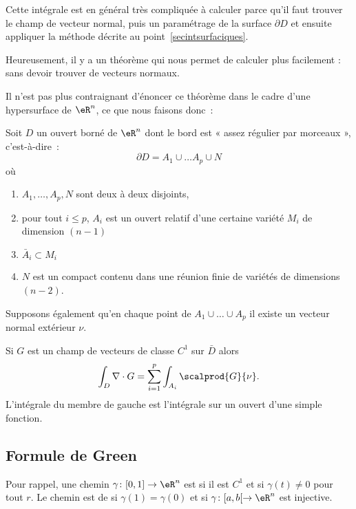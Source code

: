 Cette intégrale est en général très compliquée à calculer parce qu'il faut trouver le champ de vecteur normal, puis un paramétrage de la surface \( \partial D\) et ensuite appliquer la méthode décrite au point~\ref{secintsurfaciques}.

Heureusement, il y a un théorème qui nous permet de calculer plus facilement : sans devoir trouver de vecteurs normaux.

Il n'est pas plus contraignant d'énoncer ce théorème dans le cadre d'une hypersurface de \( \eR^n\), ce que nous faisons donc~:
\begin{theorem}
	Soit \( D\) un ouvert borné de \( \eR^n\) dont le bord est « assez régulier par morceaux », c'est-à-dire~:
	\begin{equation}
		\partial D = A_1 \cup \ldots A_p \cup N
	\end{equation}
	où
	\begin{enumerate}
		\item \( A_1, \ldots, A_p, N\) sont deux à deux disjoints,
		\item pour tout \( i \leq p\), \( A_i\) est un ouvert relatif d'une certaine variété \( M_i\) de dimension \( (n-1)\)
		\item \( \bar A_i \subset M_i\)
		\item \( N\) est un compact contenu dans une réunion finie de variétés de dimensions \( (n-2)\).
	\end{enumerate}
	Supposons également qu'en chaque point de \( A_1 \cup \ldots \cup A_p\) il existe un vecteur normal extérieur \( \nu\).

	Si \( G\) est un champ de vecteurs de classe \( C^1\) sur \( \bar D\) alors
	\begin{equation}
		\int_D \nabla\cdot G = \sum_{i=1}^p \int_{A_i} \scalprod{G}{\nu}.
	\end{equation}
	L'intégrale du membre de gauche est l'intégrale sur un ouvert d'une simple fonction.
\end{theorem}

\subsection{Formule de Green}

Pour rappel, une chemin \( \gamma\colon \mathopen[ 0 , 1 \mathclose]\to \eR^n\) est  si il est \( C^1\) et si \( \gamma(t)\neq 0\) pour tout \( r\). Le chemin est de  si \( \gamma(1)=\gamma(0)\) et si \( \gamma\colon \mathopen[ a , b [\to \eR^n\) est injective.

